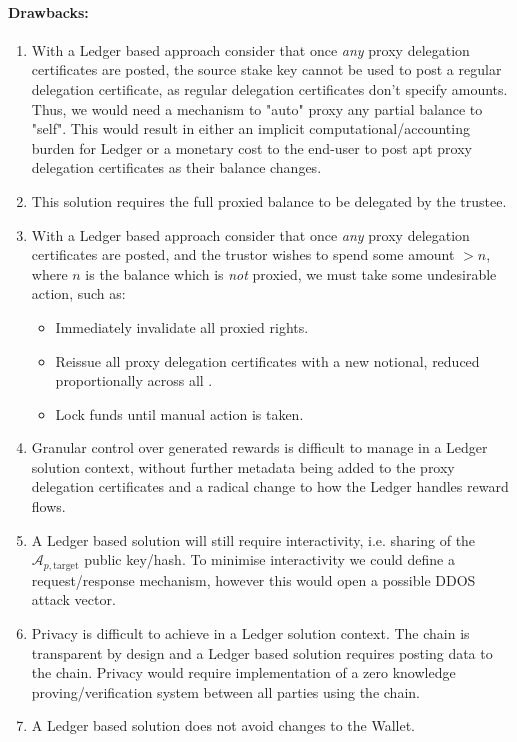 \documentclass[11pt,a4paper]{article}
\begin{document}
\paragraph{Drawbacks:}
\begin{enumerate} 
  \item With a Ledger based approach consider that once \emph{any} proxy delegation certificates are posted, the source stake key cannot be used to post a regular delegation certificate, as regular delegation certificates don't specify amounts. Thus, we would need a mechanism to "auto" proxy any partial balance to "self". This would result in either an implicit computational/accounting burden for Ledger or a monetary cost to the end-user to post apt proxy delegation certificates as their balance changes.
  \item This solution requires the full proxied balance to be delegated by the \gls{trustee}. 
  \item With a Ledger based approach consider that once \emph{any} proxy delegation certificates are posted, and the \gls{trustor} wishes to spend some amount $>n$, where $n$ is the balance which is \emph{not} proxied, we must take some undesirable action, such as:
  \begin{itemize}
    \item Immediately invalidate all proxied rights.
    \item Reissue all proxy delegation certificates with a new notional, reduced proportionally across all .
    \item Lock funds until manual action is taken. 
  \end{itemize} 
  \item Granular control over generated rewards is difficult to manage in a Ledger solution context, without further metadata being added to the proxy delegation certificates and a radical change to how the Ledger handles reward flows.
  \item A Ledger based solution will still require interactivity, i.e. sharing of the $\mathcal{A}_{p,\text{target}}$ public key/hash. To minimise interactivity we could define a request/response mechanism, however this would open a possible DDOS attack vector. 
  \item Privacy is difficult to achieve in a Ledger solution context. The chain is transparent by design and a Ledger based solution requires posting data to the chain. Privacy would require implementation of a zero knowledge proving/verification system between all parties using the chain.
  \item A Ledger based solution does not avoid changes to the Wallet. 
\end{enumerate}
\end{document}
